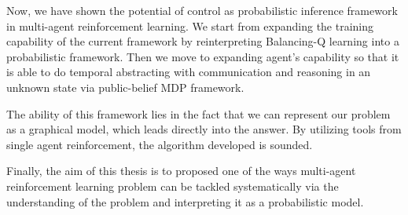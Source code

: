 \label{sec:chap6-summary}
Now, we have shown the potential of control as probabilistic inference framework in multi-agent reinforcement learning. We start from expanding the training capability of the current framework by reinterpreting Balancing-Q learning into a probabilistic framework. Then we move to expanding agent's capability so that it is able to do temporal abstracting with communication and reasoning in an unknown state via public-belief MDP framework. 

The ability of this framework lies in the fact that we can represent our problem as a graphical model, which leads directly into the answer. By utilizing tools from single agent reinforcement, the algorithm developed is sounded. 

Finally, the aim of this thesis is to proposed one of the ways multi-agent reinforcement learning problem can be tackled systematically via the understanding of the problem and interpreting it as a probabilistic model. 